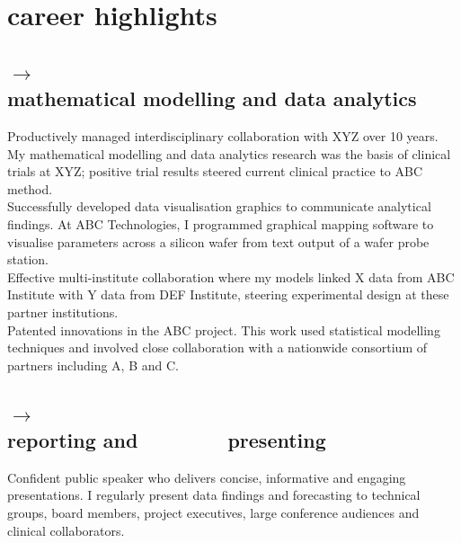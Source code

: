 \documentclass{friggeriEOSG-cv}
\begin{document}
\begin{entrylistDoublecol}
\entryDoublecol
{ }
{\section{career highlights}\vspace{0.15cm}}
\end{entrylistDoublecol}
\begin{entrylistDoublecol}
\entryDoublecol
{\subsection{{\LARGE$\longrightarrow$}\\{\Large{}mathematical modelling and data analytics}}}
{Productively managed interdisciplinary collaboration with  XYZ over 10 years. My mathematical modelling and data analytics research was the basis of clinical trials at XYZ; positive trial results steered current clinical practice to ABC method.
\\[-5pt]

Successfully developed data visualisation graphics to communicate analytical findings. At ABC Technologies, I programmed graphical mapping software to visualise parameters across a silicon wafer from text output of a wafer probe station.\\[-5pt]

Effective multi-institute collaboration where my models linked X data from ABC Institute with Y data from DEF Institute, steering experimental design at these partner institutions. \\[-5pt]

Patented innovations in the ABC project. This work used statistical modelling techniques and involved close collaboration with a nationwide consortium of partners including A, B and C.\\
\vspace{0.2cm}
}

\entryDoublecol
{\subsection{{\LARGE$\longrightarrow$}\\{\Large{}reporting and $\qquad\qquad$ presenting}}}
{Confident public speaker who delivers concise, informative and engaging presentations. I regularly present data findings and forecasting to technical groups, board members, project executives, large conference audiences and clinical collaborators.\\[-5pt] 

}
\end{entrylistDoublecol}
\end{document}
